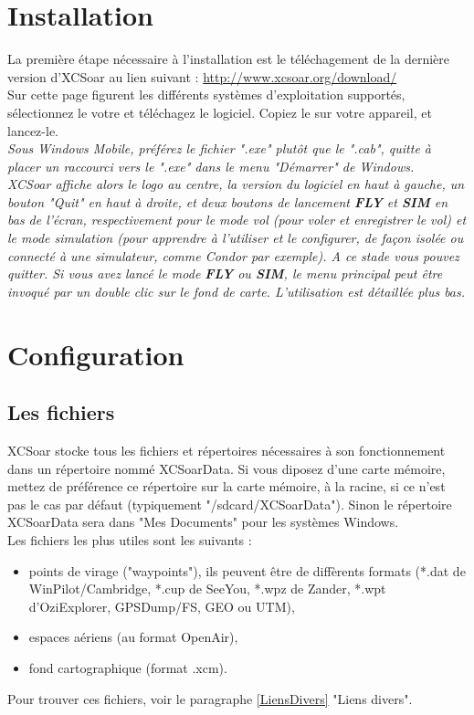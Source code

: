 \documentclass{article}
\begin{document}
\section{Installation}
\noindent
La première étape nécessaire à l'installation est le téléchagement de la dernière version d'XCSoar au lien suivant : \url{http://www.xcsoar.org/download/}\\
Sur cette page figurent les différents systèmes d'exploitation supportés, sélectionnez le votre et téléchagez le logiciel. Copiez le sur votre appareil, et lancez-le.\\
\newline
\itshape Sous Windows Mobile, préférez le fichier ".exe" plutôt que le ".cab", quitte à placer un raccourci vers le ".exe" dans le menu "Démarrer" de Windows.\upshape\\
\newline
XCSoar affiche alors le logo au centre, la version du logiciel en haut à gauche, un bouton "Quit" en haut à droite, et deux boutons de lancement \textbf{FLY} et \textbf{SIM} en bas de l'écran, respectivement pour le mode vol (pour voler et enregistrer le vol) et le mode simulation (pour apprendre à l'utiliser et le configurer, de façon isolée ou connecté à une simulateur, comme Condor par exemple). A ce stade vous pouvez quitter.
%
Si vous avez lancé le mode \textbf{FLY} ou \textbf{SIM}, le menu principal peut être invoqué par un double clic sur le fond de carte.
L'utilisation est détaillée plus bas.
%
\section{Configuration}
%
\subsection{Les fichiers}
\noindent
XCSoar stocke tous les fichiers et répertoires nécessaires à son fonctionnement dans un répertoire nommé XCSoarData. Si vous diposez d'une carte mémoire, mettez de préférence ce répertoire sur la carte mémoire, à la racine, si ce n'est pas le cas par défaut (typiquement "/sdcard/XCSoarData"). Sinon le répertoire XCSoarData sera dans "Mes Documents" pour les systèmes Windows.\\
Les fichiers les plus utiles sont les suivants :
\begin{itemize}
\item points de virage ("waypoints"), ils peuvent être de diffèrents formats (*.dat de WinPilot/Cambridge, *.cup de SeeYou, *.wpz de Zander, *.wpt d'OziExplorer, GPSDump/FS, GEO ou UTM),
\item espaces aériens (au format OpenAir),
\item fond cartographique (format .xcm).
\end{itemize}
Pour trouver ces fichiers, voir le paragraphe \ref{LiensDivers} "Liens divers".
%
\end{document}

